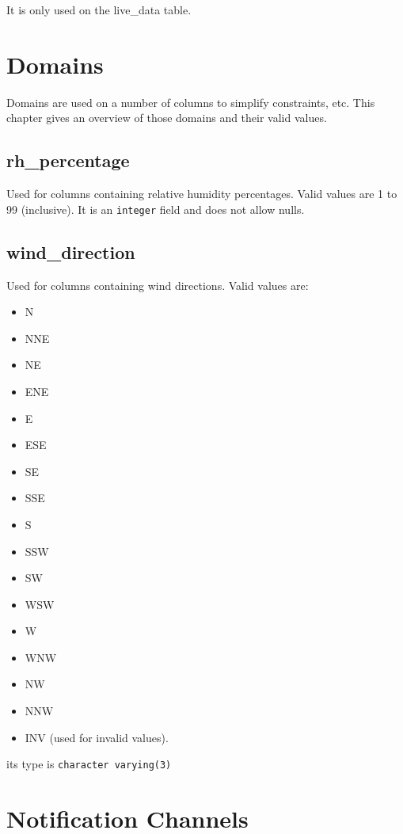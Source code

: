 \documentclass[a4paper,10pt]{book}
\begin{document}
It is only used on the live\_data table.

\chapter{Domains}
\label{cha_domains}

Domains are used on a number of columns to simplify constraints, etc. This chapter gives an overview of those domains and their valid values.

\section{rh\_percentage}
\label{rh_percentage}
Used for columns containing relative humidity percentages. Valid values are 1 to 99 (inclusive). It is an \verb|integer| field and does not allow nulls.

\section{wind\_direction}
\label{wind_direction}

Used for columns containing wind directions. Valid values are:
\begin{itemize}
\item N
\item NNE
\item NE
\item ENE
\item E
\item ESE
\item SE
\item SSE
\item S
\item SSW
\item SW
\item WSW
\item W
\item WNW
\item NW
\item NNW
\item INV (used for invalid values).
\end{itemize}

its type is \verb|character varying(3)|


\chapter{Notification Channels}
\label{cha_notify}
\end{document}
